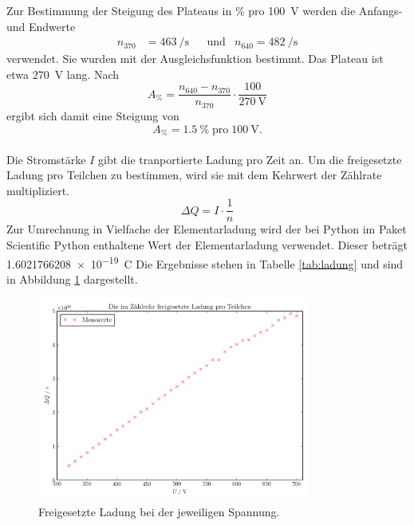 \documentclass[
  bibliography=totoc,     %
  captions=tableheading,  %
  titlepage=firstiscover, %
]{scrartcl}
\begin{document}
\noindent
Zur Bestimmung der Steigung des Plateaus in \si{\percent} pro \SI{100}{\volt}
werden die Anfangs- und Endwerte
\begin{align}
  n_{370} &= \SI{463}{\per\second} & &\text{und} &n_{640} = \SI{482}{\per\second}
\end{align}
verwendet. Sie wurden mit der Ausgleichsfunktion bestimmt. Das Plateau ist etwa
\SI{270}{\volt} lang. Nach
\begin{equation}
  A_{\si{\percent}} = \frac{n_{640}-n_{370}}{n_{370}} \cdot \frac{100}{\SI{270}{\volt}}
\end{equation}
ergibt sich damit eine Steigung von
\begin{equation}
  A_{\si{\percent}} = \SI{1.5}{\percent} \; \text{pro} \; \SI{100}{\volt}.
\end{equation}\\
Die Stromstärke $I$ gibt die tranportierte Ladung
pro Zeit an. Um die freigesetzte Ladung pro Teilchen zu bestimmen, wird
sie mit dem Kehrwert der Zählrate multipliziert.
\begin{equation}
  \Delta Q = I \cdot \frac{1}{n}
\end{equation}
Zur Umrechnung in Vielfache der Elementarladung wird der bei Python im Paket Scientific Python
enthaltene Wert der Elementarladung verwendet. Dieser beträgt \SI{1.6021766208e-19}{\coulomb}
Die Ergebnisse stehen in Tabelle \ref{tab:ladung} und sind in Abbildung \ref{fig:plot2} dargestellt.
\begin{figure}
  \centering
  \includegraphics[width=0.8\textwidth]{Plot2.pdf}
  \caption{Freigesetzte Ladung bei der jeweiligen Spannung.}
  \label{fig:plot2}
\end{figure}
\end{document}
